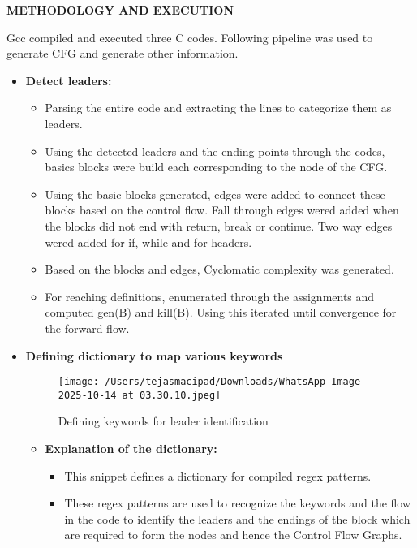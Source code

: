 \documentclass[12pt, a4paper]{report}
\newcommand{\sectionbar}[1]{%
  \vspace{0.6\baselineskip}%
  \noindent
  \colorbox{sectionbar}{%
    \parbox{\dimexpr\linewidth-2\fboxsep\relax}{%
      \textbf{\Large\textsf{#1}}%
    }%
  }%
  \vspace{0.6\baselineskip}
}
\begin{document}
\sectionbar{METHODOLOGY AND EXECUTION}

Gcc compiled and executed three C codes. Following pipeline was used to generate CFG and generate other information.

\begin{itemize}
    \item \textbf{Detect leaders:}
    \begin{itemize}
        \item Parsing the entire code and extracting the lines to categorize them as leaders.
        \item Using the detected leaders and the ending points through the codes, basics blocks were build each corresponding to the node of the CFG.
        \item Using the basic blocks generated, edges were added to connect these blocks based on the control flow. Fall through edges wered added when the blocks did not end with return, break or continue. Two way edges wered added for if, while and for headers.
        \item Based on the blocks and edges, Cyclomatic complexity was generated.
        \item For reaching definitions, enumerated through the assignments and computed gen(B) and kill(B). Using this iterated until convergence for the forward flow.
    \end{itemize}
    \item \textbf{Defining dictionary to map various keywords}
        \begin{figure}[h!]
            \centering
            \texttt{[image: /Users/tejasmacipad/Downloads/WhatsApp Image 2025-10-14 at 03.30.10.jpeg]}
            \caption{Defining keywords for leader identification}
            \label{fig:diff-example}
        \end{figure}

        \begin{itemize}
            \item \textbf{Explanation of the dictionary:}
            \begin{itemize}
                \item This snippet defines a dictionary for compiled regex patterns.
                \item These regex patterns are used to recognize the keywords and the flow in the code to identify the leaders and the endings of the block which are required to form the nodes and hence the Control Flow Graphs.
            \end{itemize}
        \end{itemize}


\end{itemize}
\end{document}
